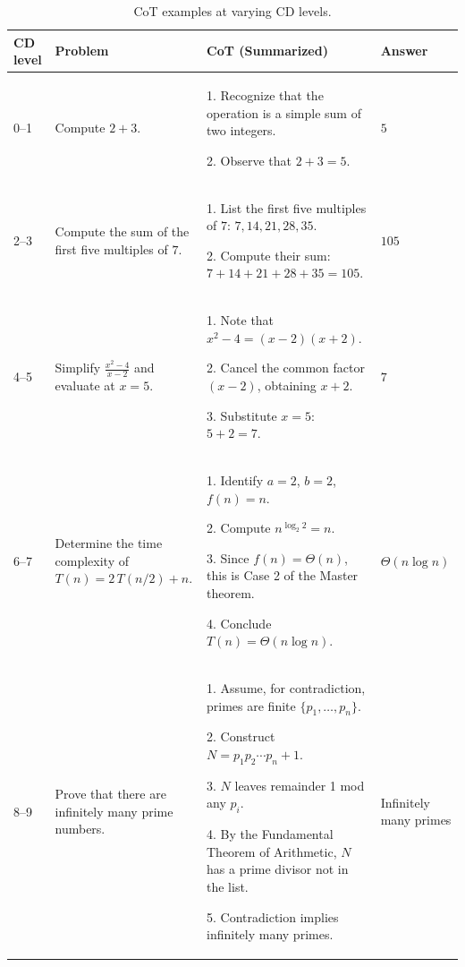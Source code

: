\documentclass{article}
\begin{document}
\begin{table}[ht]
\centering
\caption{CoT examples at varying CD levels.}
\begin{tabular}{|p{2cm}|p{3cm}|p{6cm}|p{2cm}|}
\hline
CD level & Problem & CoT (Summarized) & Answer \\ \hline
0–1 & Compute \(2 + 3\). &
1. Recognize that the operation is a simple sum of two integers.\par
2. Observe that \(2 + 3 = 5\). & \(5\) \\ \hline
2–3 & Compute the sum of the first five multiples of \(7\). &
1. List the first five multiples of \(7\): \(7, 14, 21, 28, 35\).\par
2. Compute their sum: \(7 + 14 + 21 + 28 + 35 = 105\). & \(105\) \\ \hline
4–5 & Simplify \(\frac{x^2 - 4}{x - 2}\) and evaluate at \(x = 5\). &
1. Note that \(x^2 - 4 = (x - 2)(x + 2)\).\par
2. Cancel the common factor \((x - 2)\), obtaining \(x + 2\).\par
3. Substitute \(x = 5\): \(5 + 2 = 7\). & \(7\) \\ \hline
6–7 & Determine the time complexity of \(T(n) = 2\,T(n/2) + n\). &
1. Identify \(a=2\), \(b=2\), \(f(n)=n\).\par
2. Compute \(n^{\log_2 2} = n\).\par
3. Since \(f(n)=\Theta(n)\), this is Case 2 of the Master theorem.\par
4. Conclude \(T(n)=\Theta(n\log n)\). & \(\Theta(n\log n)\) \\ \hline
8–9 & Prove that there are infinitely many prime numbers. &
1. Assume, for contradiction, primes are finite \(\{p_1,\dots,p_n\}\).\par
2. Construct \(N = p_1 p_2 \cdots p_n + 1\).\par
3. \(N\) leaves remainder 1 mod any \(p_i\).\par
4. By the Fundamental Theorem of Arithmetic, \(N\) has a prime divisor not in the list.\par
5. Contradiction implies infinitely many primes. & Infinitely many primes \\ \hline
\end{tabular}
\label{table:cd-example}
\end{table}
\end{document}
